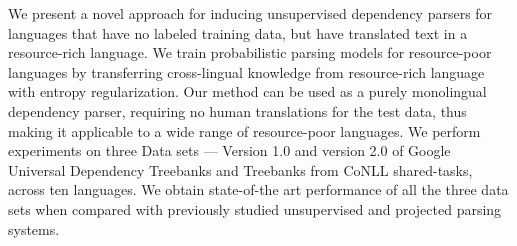 We present a novel approach for inducing unsupervised dependency parsers for languages that have no labeled training data, but have translated text in a resource-rich language. We train probabilistic parsing models for resource-poor languages by transferring cross-lingual knowledge from resource-rich language with entropy regularization. Our method can be used as a purely monolingual dependency parser, requiring no human translations for the test data, thus making it applicable to a wide range of resource-poor languages. We perform experiments on three Data sets — Version 1.0 and version 2.0 of Google Universal Dependency Treebanks and Treebanks from CoNLL shared-tasks, across ten languages. We obtain state-of-the art performance of all the three data sets when compared with previously studied unsupervised and projected parsing systems.
